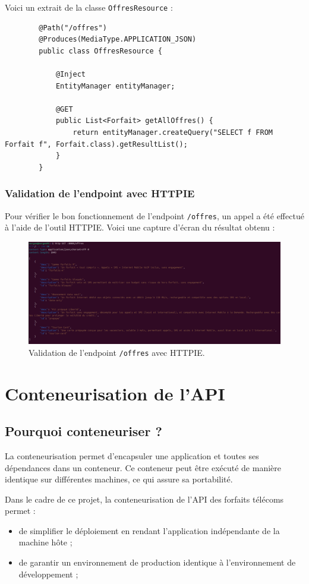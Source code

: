 \documentclass{article}
\begin{document}
	Voici un extrait de la classe \texttt{OffresResource} :
	\begin{lstlisting}
		@Path("/offres")
		@Produces(MediaType.APPLICATION_JSON)
		public class OffresResource {
			
			@Inject
			EntityManager entityManager;
			
			@GET
			public List<Forfait> getAllOffres() {
				return entityManager.createQuery("SELECT f FROM Forfait f", Forfait.class).getResultList();
			}
		}
	\end{lstlisting}
	\newpage
	\subsubsection{Validation de l'endpoint avec HTTPIE}
	
	Pour vérifier le bon fonctionnement de l'endpoint \texttt{/offres}, un appel a été effectué à l'aide de l'outil HTTPIE. Voici une capture d'écran du résultat obtenu :
	
	\begin{figure}[h!]
		\centering
		\includegraphics[width=1\textwidth]{asset/endpoint offres.png}
		\caption{Validation de l'endpoint \texttt{/offres} avec HTTPIE.}
		\label{fig:offres_endpoint}
	\end{figure}
	\section{Conteneurisation de l'API}
	
	\subsection{Pourquoi conteneuriser ?}
	
	La conteneurisation permet d'encapsuler une application et toutes ses dépendances dans un conteneur. Ce conteneur peut être exécuté de manière identique sur différentes machines, ce qui assure sa portabilité.
	
	Dans le cadre de ce projet, la conteneurisation de l'API des forfaits télécoms permet :
	\begin{itemize}
		\item de simplifier le déploiement en rendant l'application indépendante de la machine hôte ;
		\item de garantir un environnement de production identique à l'environnement de développement ;
	\end{itemize}
	
\end{document}
